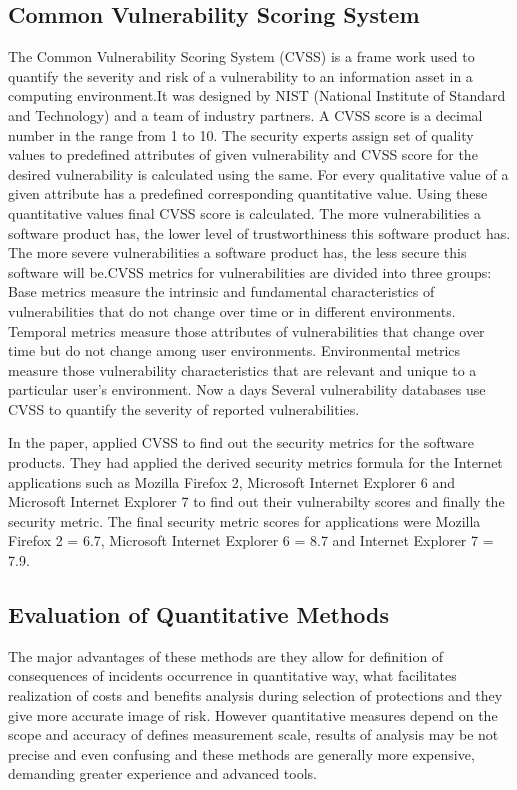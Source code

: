 \documentclass[pdftex,english,oribibl]{llncs}
\begin{document}
\subsection{Common Vulnerability Scoring System}
The Common Vulnerability Scoring System (CVSS) is a frame work used to quantify the severity and risk of a vulnerability to an information asset in a computing environment.It was designed by NIST (National Institute of Standard and Technology) and a team of industry partners. A CVSS score is a decimal number in the range from 1 to 10. The security experts assign set of quality values to predefined attributes of given vulnerability and CVSS score for the desired vulnerability is calculated using the same. For every qualitative value of a given attribute has a predefined corresponding quantitative value. Using these quantitative values final CVSS score is calculated. The more vulnerabilities a software product has, the lower level of trustworthiness this software product has. The more severe vulnerabilities a software product has, the less secure this software will be.CVSS metrics for vulnerabilities are divided into three groups: Base metrics measure the intrinsic and fundamental characteristics of vulnerabilities that do not change over time or in different environments. Temporal metrics measure those attributes of vulnerabilities that change over time but do not change among user environments. Environmental metrics measure those vulnerability characteristics that are relevant and unique to a particular user's environment. Now a days Several vulnerability databases use CVSS to quantify the severity of reported vulnerabilities.

In the paper, \cite{Wang:2009:SMS:1566445.1566509} applied CVSS to find out the security metrics for the software products. They had applied the derived security metrics formula for the Internet applications such as Mozilla Firefox 2, Microsoft Internet Explorer 6  and Microsoft Internet Explorer 7 to find out their vulnerabilty scores and finally the security metric. The final security metric scores for applications were Mozilla Firefox 2 = 6.7, Microsoft Internet Explorer 6 = 8.7 and Internet Explorer 7 = 7.9. 

\subsection{Evaluation of Quantitative Methods}
The major advantages of these methods are they allow for definition of consequences of incidents occurrence in quantitative way, what facilitates realization of costs and benefits analysis during selection of protections and they give more accurate image of risk. However quantitative measures depend on the scope and accuracy of defines measurement scale, results of analysis may be not precise and even confusing and these methods are generally more expensive, demanding greater experience and advanced tools.
	
\end{document}
